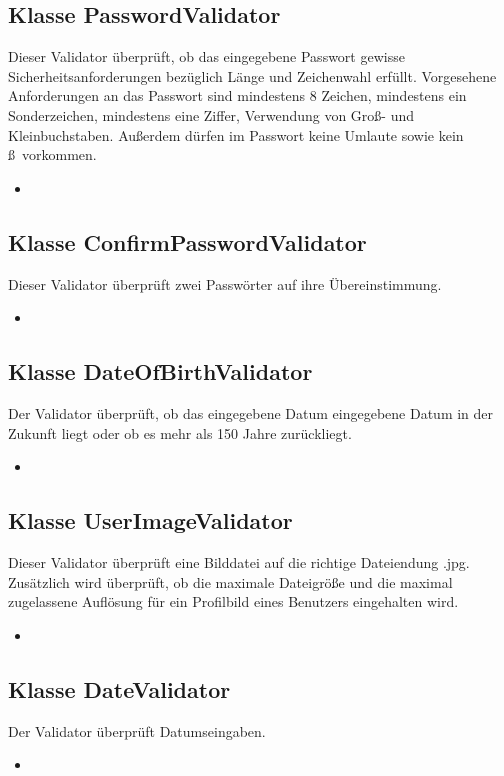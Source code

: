 	\subsection{Klasse PasswordValidator}
	Dieser Validator überprüft, ob das eingegebene Passwort gewisse Sicherheitsanforderungen bezüglich Länge und Zeichenwahl erfüllt. Vorgesehene Anforderungen an das Passwort sind mindestens 8 Zeichen, mindestens ein Sonderzeichen, mindestens eine Ziffer, Verwendung von Groß- und Kleinbuchstaben. Außerdem dürfen im Passwort keine Umlaute sowie kein \grq ß\grq \ vorkommen.
	\begin{itemize}
		\item \override
	\end{itemize}
	
	\subsection{Klasse ConfirmPasswordValidator}
	Dieser Validator überprüft zwei Passwörter auf ihre Übereinstimmung.
	\begin{itemize}
		\item \override
	\end{itemize}
	
	\subsection{Klasse DateOfBirthValidator}
	Der Validator überprüft, ob das eingegebene Datum eingegebene Datum in der Zukunft liegt oder ob es mehr als 150 Jahre zurückliegt.
	\begin{itemize}
		\item \override
	\end{itemize}
	
	\subsection{Klasse UserImageValidator}
	Dieser Validator überprüft eine Bilddatei auf die richtige Dateiendung .jpg. Zusätzlich wird überprüft, ob
	die maximale Dateigröße und die maximal zugelassene Auflösung für ein Profilbild eines Benutzers eingehalten wird.
	\begin{itemize}
		\item \override
	\end{itemize}
	
	\subsection{Klasse DateValidator}
	Der Validator überprüft Datumseingaben.
	\begin{itemize}
		\item \override
	\end{itemize}
	
